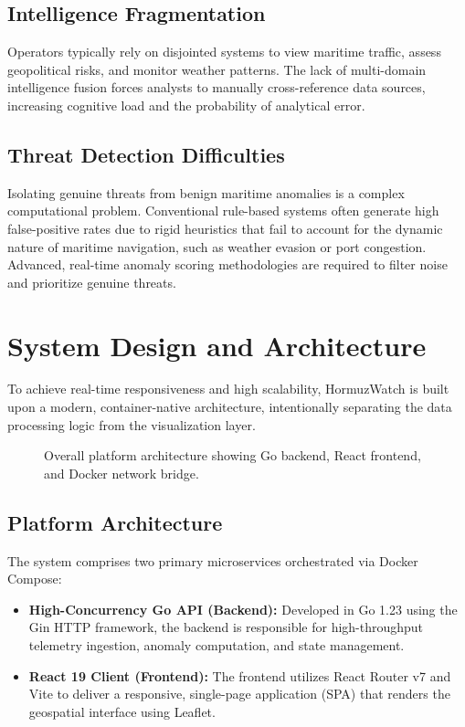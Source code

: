 \documentclass[11pt,a4paper]{article}
\begin{document}
\subsection{Intelligence Fragmentation}
Operators typically rely on disjointed systems to view maritime traffic, assess geopolitical risks, and monitor weather patterns. The lack of multi-domain intelligence fusion forces analysts to manually cross-reference data sources, increasing cognitive load and the probability of analytical error.

\subsection{Threat Detection Difficulties}
Isolating genuine threats from benign maritime anomalies is a complex computational problem. Conventional rule-based systems often generate high false-positive rates due to rigid heuristics that fail to account for the dynamic nature of maritime navigation, such as weather evasion or port congestion. Advanced, real-time anomaly scoring methodologies are required to filter noise and prioritize genuine threats.

\section{System Design and Architecture}
To achieve real-time responsiveness and high scalability, HormuzWatch is built upon a modern, container-native architecture, intentionally separating the data processing logic from the visualization layer.

\begin{figure}[h]
    \centering
    \caption{Overall platform architecture showing Go backend, React frontend, and Docker network bridge.}
    \label{fig:architecture}
\end{figure}

\subsection{Platform Architecture}
The system comprises two primary microservices orchestrated via Docker Compose:
\begin{itemize}
    \item \textbf{High-Concurrency Go API (Backend):} Developed in Go 1.23 using the Gin HTTP framework, the backend is responsible for high-throughput telemetry ingestion, anomaly computation, and state management.
    \item \textbf{React 19 Client (Frontend):} The frontend utilizes React Router v7 and Vite to deliver a responsive, single-page application (SPA) that renders the geospatial interface using Leaflet.
\end{itemize}
\end{document}
